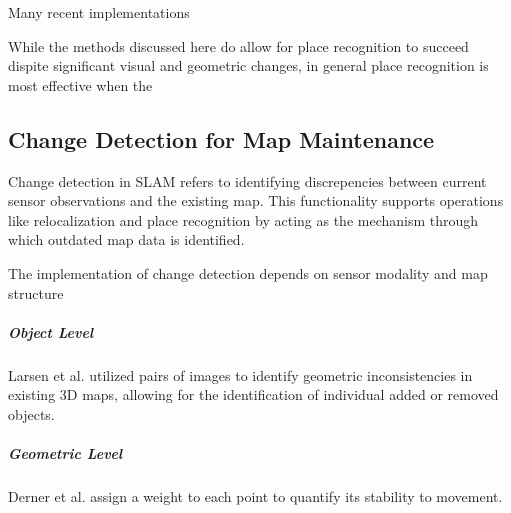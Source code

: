 Many recent implementations 

While the methods discussed here do allow for place recognition to succeed dispite significant visual and geometric changes, in general place recognition is most effective when the 

\subsection{Change Detection for Map Maintenance}

Change detection in SLAM refers to identifying discrepencies between current sensor observations and the existing map. This functionality supports operations like relocalization and place recognition by acting as the mechanism through which outdated map data is identified.

The implementation of change detection depends on sensor modality and map structure




\subparagraph{Object Level}
Larsen et al. \cite{larsenChangeDetectionModel} utilized pairs of images to identify geometric inconsistencies in existing 3D maps, allowing for the identification of individual added or removed objects.

\subparagraph{Geometric Level}
Derner et al. \cite{dernerChangeDetectionUsing2021} assign a weight to each point to quantify its stability to movement.




